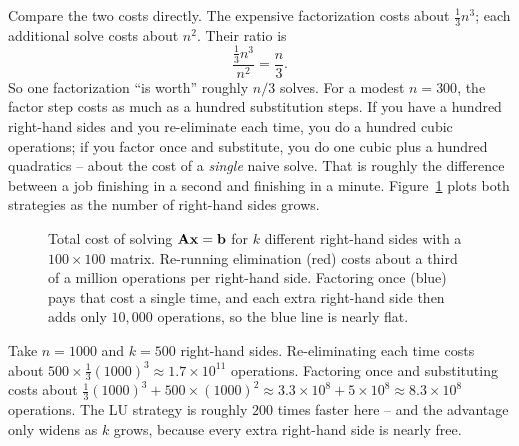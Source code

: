 Compare the two costs directly. The expensive factorization costs about
$\tfrac13 n^3$; each additional solve costs about $n^2$. Their ratio is
\[
  \frac{\tfrac13 n^3}{n^2} = \frac{n}{3}.
\]
So one factorization ``is worth'' roughly $n/3$ solves. For a modest $n=300$, the factor
step costs as much as a hundred substitution steps. If you have a hundred right-hand sides
and you re-eliminate each time, you do a hundred cubic operations; if you factor once and
substitute, you do one cubic plus a hundred quadratics -- about the cost of a
\emph{single} naive solve. That is roughly the difference between a job finishing in a
second and finishing in a minute. Figure~\ref{ch09:fig-cost-vs-k} plots both strategies as the
number of right-hand sides grows.

\begin{figure}[htbp]
\centering
{}
\caption{Total cost of solving $\mathbf{A}\mathbf{x}=\mathbf{b}$ for $k$ different right-hand sides
with a $100\times 100$ matrix. Re-running elimination (red) costs about a third of a million
operations per right-hand side. Factoring once (blue) pays that cost a single time, and each
extra right-hand side then adds only $10{,}000$ operations, so the blue line is nearly flat.}
\label{ch09:fig-cost-vs-k}
\end{figure}

\begin{example}
\label{ch09:ex-count}
Take $n=1000$ and $k=500$ right-hand sides. Re-eliminating each time costs about
$500 \times \tfrac13(1000)^3 \approx 1.7\times 10^{11}$ operations. Factoring once and
substituting costs about $\tfrac13(1000)^3 + 500\times(1000)^2 \approx 3.3\times 10^8 +
5\times 10^8 \approx 8.3\times 10^8$ operations. The LU strategy is roughly $200$ times
faster here -- and the advantage only widens as $k$ grows, because every extra right-hand
side is nearly free.
\end{example}

